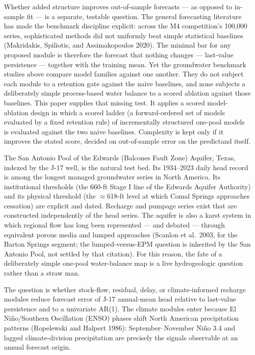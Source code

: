 \documentclass[11pt]{article}
\begin{document}
Whether added structure improves out-of-sample forecasts --- as opposed
to in-sample fit --- is a separate, testable question. The general
forecasting literature has made the benchmark discipline explicit:
across the M4 competition's 100,000 series, sophisticated methods did
not uniformly beat simple statistical baselines (Makridakis, Spiliotis,
and Assimakopoulos 2020). The minimal bar for any proposed module is
therefore the forecast that nothing changes --- last-value persistence
--- together with the training mean. Yet the groundwater benchmark
studies above compare model families against one another. They do not
subject each module to a retention gate against the naive baselines, and
none subjects a deliberately simple process-based water balance to a
scored ablation against those baselines. This paper supplies that
missing test. It applies a scored model-ablation design in which a
scored ladder (a forward-ordered set of models evaluated by a fixed
retention rule) of incrementally structured one-pool models is evaluated
against the two naive baselines. Complexity is kept only if it improves
the stated score, decided on out-of-sample error on the predictand
itself.

The San Antonio Pool of the Edwards (Balcones Fault Zone) Aquifer,
Texas, indexed by the J-17 well, is the natural test bed. Its 1934--2023
daily head record is among the longest managed groundwater series in
North America. Its institutional thresholds (the 660-ft Stage I line of
the Edwards Aquifer Authority) and its physical threshold (the \ensuremath{\approx}618-ft
level at which Comal Springs approaches cessation) are explicit and
dated. Recharge and pumpage series exist that are constructed
independently of the head series. The aquifer is also a karst system in
which regional flow has long been represented --- and debated ---
through equivalent porous media and lumped approaches (Scanlon et
al.~2003, for the Barton Springs segment; the lumped-versus-EPM question
is inherited by the San Antonio Pool, not settled by that citation). For
this reason, the fate of a deliberately simple one-pool water-balance
map is a live hydrogeologic question rather than a straw man.

The question is whether stock-flow, residual, delay, or climate-informed
recharge modules reduce forecast error of J-17 annual-mean head relative
to last-value persistence and to a univariate AR(1). The climate modules
enter because El Ni\~no/Southern Oscillation (ENSO) phases shift North
American precipitation patterns (Ropelewski and Halpert 1986):
September--November Ni\~no 3.4 and lagged climate-division precipitation
are precisely the signals observable at an annual forecast origin.
\end{document}
